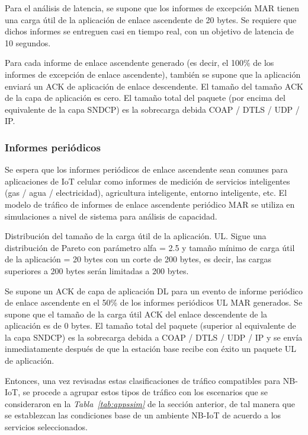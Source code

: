 Para el análisis de latencia, se supone que los informes de excepción MAR tienen una carga útil de la aplicación de enlace ascendente de 20 bytes. Se requiere que dichos informes se entreguen casi en tiempo real, con un objetivo de latencia de 10 segundos.\newline

Para cada informe de enlace ascendente generado (es decir, el 100\% de los informes de excepción de enlace ascendente), también se supone que la aplicación enviará un ACK de aplicación de enlace descendente. El tamaño del tamaño ACK de la capa de aplicación es cero. El tamaño total del paquete (por encima del equivalente de la capa SNDCP) es la sobrecarga debida COAP / DTLS / UDP / IP.

\subsubsection{Informes periódicos}\label{Informesperiodicos}

Se espera que los informes periódicos de enlace ascendente sean comunes para aplicaciones de IoT celular como informes de medición de servicios inteligentes (gas / agua / electricidad), agricultura inteligente, entorno inteligente, etc. El modelo de tráfico de informes de enlace ascendente periódico MAR se utiliza en simulaciones a nivel de sistema para análisis de capacidad.\newline

Distribución del tamaño de la carga útil de la aplicación. UL. Sigue una distribución de Pareto con parámetro alfa = 2.5 y tamaño mínimo de carga útil de la aplicación = 20 bytes con un corte de 200 bytes, es decir, las cargas superiores a 200 bytes serán limitadas a 200 bytes.\newline

Se supone un ACK de capa de aplicación DL para un evento de informe periódico de enlace ascendente en el 50\% de los informes periódicos UL MAR generados. Se supone que el tamaño de la carga útil ACK del enlace descendente de la aplicación es de 0 bytes. El tamaño total del paquete (superior al equivalente de la capa SNDCP) es la sobrecarga debida a COAP / DTLS / UDP / IP y se envía inmediatamente después de que la estación base recibe con éxito un paquete UL de aplicación.\newline

Entonces, una vez revisadas estas clasificaciones de tráfico compatibles para NB-IoT, se procede a agrupar estos tipos de tráfico con los escenarios que se consideraron en la \textit{Tabla~\ref{tab:appssim}} de la sección anterior, de tal manera que se establezcan las condiciones base de un ambiente NB-IoT de acuerdo a los servicios seleccionados.\newline

